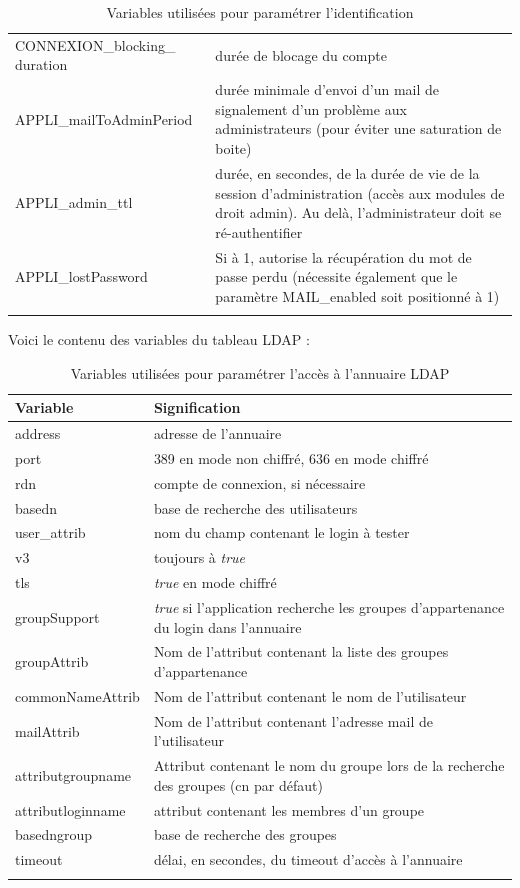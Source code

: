 \begin{longtable}{|p{5cm}|p{8cm}|}
CONNEXION\_blocking\_ duration & durée de blocage du compte \\

APPLI\_mailToAdminPeriod & durée minimale d'envoi d'un mail de signalement d'un problème aux administrateurs (pour éviter une saturation de boite) \\

APPLI\_admin\_ttl & durée, en secondes, de la durée de vie de la session d'administration (accès aux modules de droit admin). Au delà, l'administrateur doit se ré-authentifier \\

APPLI\_lostPassword & Si à 1, autorise la récupération du mot de passe perdu (nécessite également que le paramètre MAIL\_enabled soit positionné à 1) \\
\hline

\caption{Variables utilisées pour paramétrer l'identification}
\end{longtable}

Voici le contenu des variables du tableau LDAP : 
\begin{longtable}{|p{5cm}|p{8cm}|}
\hline
\textbf{Variable} & \textbf{Signification} \\
\hline
\endhead
address &  adresse de l'annuaire\\
port & 389 en mode non chiffré, 636 en mode chiffré\\
rdn & compte de connexion, si nécessaire \\
basedn & base de recherche des utilisateurs\\
user\_attrib & nom du champ contenant le login à tester\\
v3 & toujours à \textit{true}\\
tls & \textit{true} en mode chiffré\\
groupSupport & \textit{true} si l'application recherche les groupes d'appartenance du login dans l'annuaire\\
groupAttrib & Nom de l'attribut contenant la liste des groupes d'appartenance\\
commonNameAttrib & Nom de l'attribut contenant le nom de l'utilisateur\\
mailAttrib & Nom de l'attribut contenant l'adresse mail de l'utilisateur\\
attributgroupname & Attribut contenant le nom du groupe lors de la recherche des groupes (cn par défaut)\\
attributloginname & attribut contenant les membres d'un groupe\\
basedngroup & base de recherche des groupes \\
timeout & délai, en secondes, du timeout d'accès à l'annuaire \\
\hline
\caption{Variables utilisées pour paramétrer l'accès à l'annuaire LDAP}
\end{longtable}

